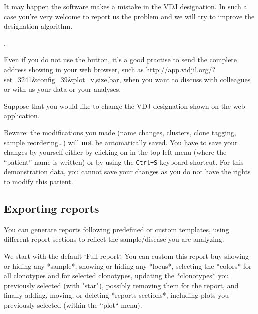 \bigskip

It may happen the software makes a mistake in the VDJ designation.
In such a case you're very welcome to report us the problem
and we will try to improve the designation algorithm.

.

Even if you do not use the  button, it's a good practise
to send the complete address showing in your web browser, such
as  \url{http://app.vidjil.org/?set=3241&config=39&plot=v,size,bar},
when you want to discuss with colleagues or with us your data or your analyses.

\bigskip

Suppose that you would like to change the VDJ designation shown on the web application.

Beware: the modifications you made (name changes, clusters, clone
tagging, sample reordering\dots) will \textbf{not} be automatically saved. You have to save
your changes by yourself either by clicking on  in the top left menu (where the
``patient'' name is written) or by using the \texttt{Ctrl+S} keyboard
shortcut.
For this demonstration data, you cannot save your changes as you do not have
the rights to modify this patient.

\subsection{Exporting reports}

You can generate reports following predefined or custom templates, using different report sections
to reflect the sample/disease you are analyzing.


We start with the default `Full report`.
You can custom this report buy showing or hiding any *sample*,
showing or hiding any *locus*, selecting the *colors* for all clonotypes and for selected clonotypes,
updating the *clonotypes* you previously selected (with "star"),  possibly removing them for the report,
and finally adding, moving, or deleting *reports sections*, including plots you previously selected (within the “plot“ menu).

